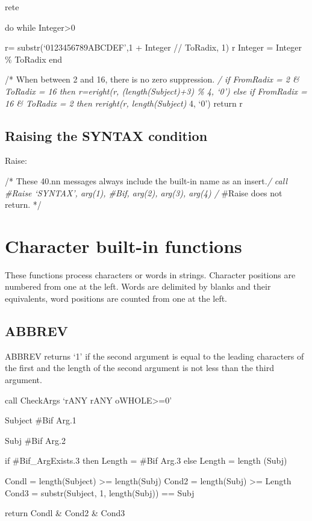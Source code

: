 rete

do while Integer\textgreater0

r= substr(`0123456789ABCDEF',1 + Integer // ToRadix, 1)
\textbar\textbar{} r Integer = Integer \% ToRadix end

/* When between 2 and 16, there is no zero suppression. \emph{/ if
FromRadix = 2 \& ToRadix = 16 then r=eright(r, (length(Subject)+3) \% 4,
`0') else if FromRadix = 16 \& ToRadix = 2 then reright(r,
length(Subject) } 4, `0') return r

\subsection{Raising the SYNTAX
condition}\label{raising-the-syntax-condition}

Raise:

/* These 40.nn messages always include the built-in name as an
insert.\emph{/ call \#Raise `SYNTAX', arg(1), \#Bif, arg(2), arg(3),
arg(4) /} \#Raise does not return. */

\section{Character built-in
functions}\label{character-built-in-functions}

These functions process characters or words in strings. Character
positions are numbered from one at the left. Words are delimited by
blanks and their equivalents, word positions are counted from one at the
left.

\subsection{ABBREV}\label{abbrev}

ABBREV returns `1' if the second argument is equal to the leading
characters of the first and the length of the second argument is not
less than the third argument.

call CheckArgs `rANY rANY oWHOLE\textgreater=0'

Subject \#Bif Arg.1

Subj \#Bif Arg.2

if \#Bif\_ArgExists.3 then Length = \#Bif Arg.3 else Length = length
(Subj)

Condl = length(Subject) \textgreater= length(Subj) Cond2 = length(Subj)
\textgreater= Length Cond3 = substr(Subject, 1, length(Subj)) == Subj

return Condl \& Cond2 \& Cond3

